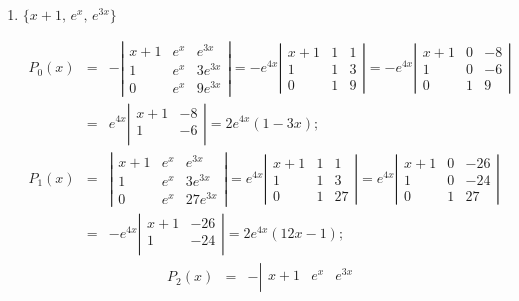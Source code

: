 \documentclass{ximera}
\begin{document}
\begin{problem}
\begin{enumerate}
\item $\{x+1,\,e^x,\,e^{3x}\}$

\begin{solution}
\begin{eqnarray*}
P_0(x)&=&
-\left|\begin{array}{ccc}
x+1&e^x&e^{3x}\\
1&e^x&3e^{3x}\\
0&e^x&9e^{3x}
\end{array}\right|=
-e^{4x}\left|\begin{array}{ccc}
x+1&1&1\\
1&1&3\\
0&1&9
\end{array}\right|=
-e^{4x}\left|\begin{array}{ccc}
x+1&0&-8\\
1&0&-6\\
0&1&9
\end{array}\right|\\
&=&e^{4x}\left|\begin{array}{cc}
x+1&-8\\
1&-6\\
\end{array}\right|
=2e^{4x}(1-3x);
\end{eqnarray*}
\begin{eqnarray*}
P_1(x)&=&
\left|\begin{array}{ccc}
x+1&e^x&e^{3x}\\
1&e^x&3e^{3x}\\
0&e^x&27e^{3x}
\end{array}\right|=
e^{4x}\left|\begin{array}{ccc}
x+1&1&1\\
1&1&3\\
0&1&27
\end{array}\right|=
e^{4x}\left|\begin{array}{ccc}
x+1&0&-26\\
1&0&-24\\
0&1&27
\end{array}\right|\\
&=&-e^{4x}\left|\begin{array}{ccc}
x+1&-26\\
1&-24\\
\end{array}\right|=2e^{4x}(12x-1);
\end{eqnarray*}
\begin{eqnarray*}
P_2(x)&=&
-\left|\begin{array}{ccc}
x+1&e^x&e^{3x}\\

\end{array}
\end{eqnarray*}
\end{solution}
\end{enumerate}
\end{problem}
\end{document}
